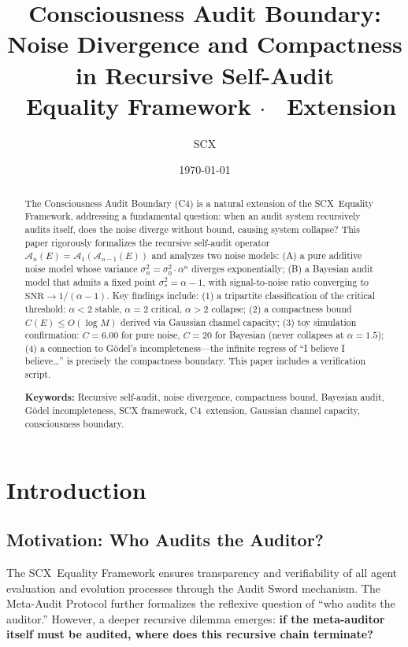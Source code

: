 \documentclass[12pt,a4paper]{article}
\title{
    \textbf{Consciousness Audit Boundary: Noise Divergence and Compactness in Recursive Self-Audit}\\[0.5em]
    \normalsize \SCX\ Equality Framework \;$\cdot$\; \Cfour\ Extension
}
\author{SCX}
\date{\today}
\theoremstyle{definition}
\newcommand{\SCX}{\textsf{SCX}}
\newcommand{\Cfour}{\textsc{C4}}
\newcommand{\AuditOp}{\mathcal{A}}
\newcommand{\SNR}{\mathrm{SNR}}
\begin{document}
\maketitle

\begin{abstract}
\noindent
The Consciousness Audit Boundary (\Cfour) is a natural extension of the \SCX\ Equality Framework, addressing a fundamental question: when an audit system recursively audits itself, does the noise diverge without bound, causing system collapse? This paper rigorously formalizes the recursive self-audit operator $\AuditOp_n(E) = \AuditOp_1(\AuditOp_{n-1}(E))$ and analyzes two noise models: (A) a pure additive noise model whose variance $\sigma_n^2 = \sigma_0^2 \cdot \alpha^n$ diverges exponentially; (B) a Bayesian audit model that admits a fixed point $\sigma_*^2 = \alpha - 1$, with signal-to-noise ratio converging to $\SNR \to 1/(\alpha-1)$. Key findings include: (1) a tripartite classification of the critical threshold: $\alpha < 2$ stable, $\alpha = 2$ critical, $\alpha > 2$ collapse; (2) a compactness bound $C(E) \leq O(\log M)$ derived via Gaussian channel capacity; (3) toy simulation confirmation: $C=6.00$ for pure noise, $C=20$ for Bayesian (never collapses at $\alpha=1.5$); (4) a connection to G\"{o}del's incompleteness---the infinite regress of ``I believe I believe\ldots'' is precisely the compactness boundary. This paper includes a verification script.

\vspace{0.5em}
\noindent
\textbf{Keywords:} Recursive self-audit, noise divergence, compactness bound, Bayesian audit, G\"{o}del incompleteness, SCX framework, \Cfour\ extension, Gaussian channel capacity, consciousness boundary.
\end{abstract}

\section{Introduction}

\subsection{Motivation: Who Audits the Auditor?}

The \SCX\ Equality Framework ensures transparency and verifiability of all agent evaluation and evolution processes through the Audit Sword mechanism. The Meta-Audit Protocol further formalizes the reflexive question of ``who audits the auditor.'' However, a deeper recursive dilemma emerges: \textbf{if the meta-auditor itself must be audited, where does this recursive chain terminate?}
\end{document}
